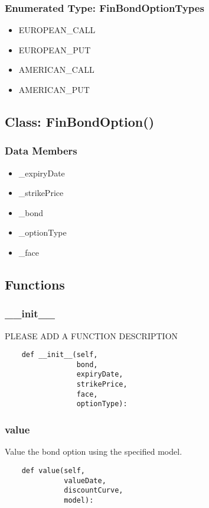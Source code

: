 \documentclass[twoside,11pt]{book}
\begin{document}
\subsubsection{Enumerated Type: FinBondOptionTypes}
\begin{itemize}
\item{EUROPEAN\_CALL}
\item{EUROPEAN\_PUT}
\item{AMERICAN\_CALL}
\item{AMERICAN\_PUT}
\end{itemize}

\subsection*{Class: FinBondOption()}


\subsubsection*{Data Members}
\begin{itemize}
\item{\_expiryDate}
\item{\_strikePrice}
\item{\_bond}
\item{\_optionType}
\item{\_face}
\end{itemize}

\subsection*{Functions}

\subsubsection*{{\bf \_\_init\_\_}}
PLEASE ADD A FUNCTION DESCRIPTION

\begin{lstlisting}
    def __init__(self,
                 bond,
                 expiryDate,
                 strikePrice,
                 face,
                 optionType):
\end{lstlisting}

\subsubsection*{{\bf value}}
Value the bond option using the specified model.  

\begin{lstlisting}
    def value(self,
              valueDate,
              discountCurve,
              model):
\end{lstlisting}
\end{document}

